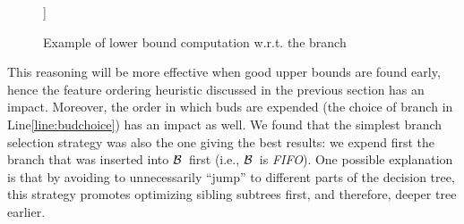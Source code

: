 \documentclass{llncs}
\def\posclass{+}
\def\negclass{-}
\newcommand{\bud}[0]{\ensuremath{{\cal B}}}
\begin{document}
\begin{example}
\begin{figure}
\begin{center}
{\begin{forest}
				]
			\end{forest}
		}
	\end{center}
	\caption{\label{fig:lowerbound} Example of lower bound computation w.r.t. the branch }
	\end{figure}

\end{example}


\medskip

This reasoning will be more effective when good upper bounds are found early, hence the feature ordering heuristic discussed in the previous section has an impact. Moreover, the order in which buds are expended (the choice of branch in Line\ref{line:budchoice}) has an impact as well. We found that the simplest branch selection strategy was also the one giving the best results: we expend first the branch that was inserted into \bud\ first (i.e., \bud\ is \emph{FIFO}). One possible explanation is that by avoiding to unnecessarily ``jump'' to different parts of the decision tree, this strategy promotes optimizing sibling subtrees first, and therefore, deeper tree earlier.
\end{document}
